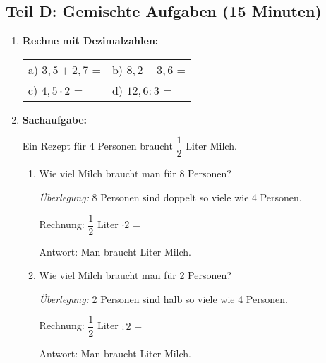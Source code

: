 \subsection*{Teil D: Gemischte Aufgaben (15 Minuten)}

\begin{enumerate}[resume, label=\arabic*.]
    \item \textbf{Rechne mit Dezimalzahlen:}

    \vspace{0.5cm}
    \begin{tabular}{ll}
        a) $3,5 + 2,7$ = \underline{\hspace{3cm}} & b) $8,2 - 3,6$ = \underline{\hspace{3cm}} \\[2ex]
        c) $4,5 \cdot 2$ = \underline{\hspace{3cm}} & d) $12,6 : 3$ = \underline{\hspace{3cm}}
    \end{tabular}

    \vspace{1cm}

    \item \textbf{Sachaufgabe:} 

    Ein Rezept für 4 Personen braucht $\dfrac{1}{2}$ Liter Milch.

    \begin{enumerate}[label=\alph*)]
        \item Wie viel Milch braucht man für 8 Personen?

        \vspace{0.3cm}
        \textit{Überlegung:} 8 Personen sind doppelt so viele wie 4 Personen.

        \vspace{0.3cm}
        Rechnung: $\dfrac{1}{2}$ Liter $\cdot 2$ = \underline{\hspace{5cm}}

        \vspace{0.3cm}
        Antwort: Man braucht \underline{\hspace{3cm}} Liter Milch.

        \vspace{0.5cm}
        \item Wie viel Milch braucht man für 2 Personen?

        \vspace{0.3cm}
        \textit{Überlegung:} 2 Personen sind halb so viele wie 4 Personen.

        \vspace{0.3cm}
        Rechnung: $\dfrac{1}{2}$ Liter $: 2$ = \underline{\hspace{5cm}}

        \vspace{0.3cm}
        Antwort: Man braucht \underline{\hspace{3cm}} Liter Milch.
    \end{enumerate}
\end{enumerate}